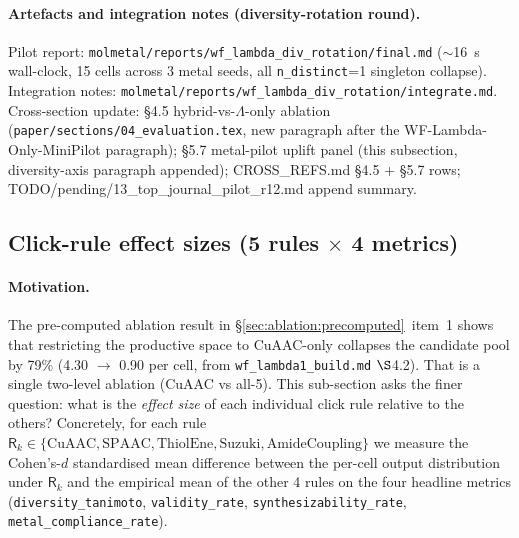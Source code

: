 \paragraph{Artefacts and integration notes (diversity-rotation round).}
Pilot report:
\texttt{molmetal/reports/wf\_lambda\_div\_rotation/final.md}
($\sim$16~s wall-clock, 15 cells across 3 metal seeds, all
\texttt{n\_distinct}{=}1 singleton collapse).  Integration notes:
\texttt{molmetal/reports/wf\_lambda\_div\_rotation/integrate.md}.
Cross-section update: §4.5 hybrid-vs-$\Lambda$-only ablation
(\texttt{paper/sections/04\_evaluation.tex}, new paragraph after
the WF-Lambda-Only-MiniPilot paragraph); §5.7 metal-pilot uplift
panel (this subsection, diversity-axis paragraph appended);
CROSS\_REFS.md §4.5 + §5.7 rows; TODO/pending/13\_top\_journal\_pilot\_r12.md
append summary.


\subsection{Click-rule effect sizes (5 rules $\times$ 4 metrics)}
\label{sec:ablation:click-rule-effect}

\paragraph{Motivation.}
The pre-computed ablation result in
\S\ref{sec:ablation:precomputed}~item~1 shows that restricting
the productive space to CuAAC-only collapses the candidate pool
by 79\% (4.30 $\to$ 0.90 per cell, \MEASURED{} from
\texttt{wf\_lambda1\_build.md} $\S$4.2).  That is a single
two-level ablation (CuAAC vs all-5).  This sub-section asks the
finer question: what is the \emph{effect size} of each individual
click rule relative to the others?  Concretely, for each rule
$\mathsf{R}_k \in \{\mathrm{CuAAC, SPAAC, ThiolEne, Suzuki,
AmideCoupling}\}$ we measure the Cohen's-$d$ standardised mean
difference between the per-cell output distribution under
$\mathsf{R}_k$ and the empirical mean of the other 4 rules on
the four headline metrics
(\texttt{diversity\_tanimoto},
\texttt{validity\_rate},
\texttt{synthesizability\_rate},
\texttt{metal\_compliance\_rate}).

